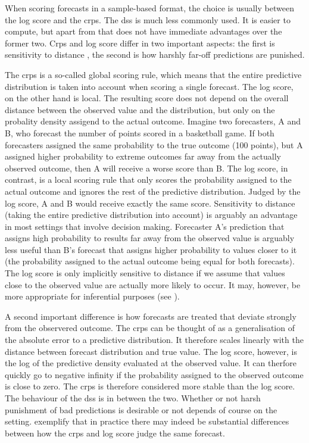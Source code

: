 \documentclass[article,shortnames]{jss}
\begin{document}
When scoring forecasts in a sample-based format, the choice is usually between the log score and the crps. The dss is much less commonly used. It is easier to compute, but apart from that does not have immediate advantages over the former two. Crps and log score differ in two important aspects: the first is sensitivity to distance \cite{winklerScoringRulesEvaluation1996}, the second is how harshly far-off predictions are punished. 

The crps is a so-called global scoring rule, which means that the entire predictive distribution is taken into account when scoring a single forecast. The log score, on the other hand is local. The resulting score does not depend on the overall distance between the observed value and the distribution, but only on the probality density assigend to the actual outcome. Imagine two forecasters, A and B, who forecast the number of points scored in a basketball game. If both forecasters assigned the same probability to the true outcome (100 points), but A assigned higher probability to extreme outcomes far away from the actually observed outcome, then A will receive a worse score than B. The log score, in contrast, is a local scoring rule that only scores the probability assigned to the actual outcome and ignores the rest of the predictive distribution. Judged by the log score, A and B would receive exactly the same score. Sensitivity to distance (taking the entire predictive distribution into account) is arguably an advantage in most settings that involve decision making. Forecaster A's prediction that assigns high probability to results far away from the observed value is arguably less useful than B's forecast that assigns higher probability to values closer to it (the probability assigned to the actual outcome being equal for both forecasts). The log score is only implicitly sensitive to distance if we assume that values close to the observed value are actually more likely to occur. It may, however, be more appropriate for inferential purposes (see \cite{winklerScoringRulesEvaluation1996}). 

A second important difference is how forecasts are treated that deviate strongly from the observered outcome. The crps can be thought of as a generalisation of the absolute error to a predictive distribution. It therefore scales linearly with the distance between forecast distribution and true value. The log score, however, is the log of the predictive density evaluated at the observed value. It can therfore quickly go to negative infinity if the probability assigned to the observed outcome is close to zero. The crps is therefore considered more stable than the log score. The behaviour of the dss is in between the two. Whether or not harsh punishment of bad predictions is desirable or not depends of course on the setting. \cite{bracherEvaluatingEpidemicForecasts2020a} exemplify that in practice there may indeed be substantial differences between how the crps and log score judge the same forecast. 
\end{document}
